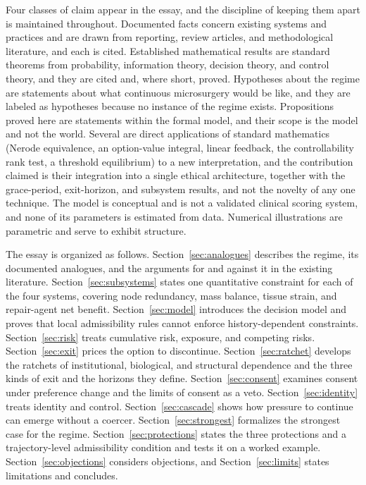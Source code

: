 \documentclass[11pt]{article}
\theoremstyle{plain}
\theoremstyle{definition}
\theoremstyle{remark}
\begin{document}
Four classes of claim appear in the essay, and the discipline of keeping them apart is maintained throughout. Documented facts concern existing systems and practices and are drawn from reporting, review articles, and methodological literature, and each is cited. Established mathematical results are standard theorems from probability, information theory, decision theory, and control theory, and they are cited and, where short, proved. Hypotheses about the regime are statements about what continuous microsurgery would be like, and they are labeled as hypotheses because no instance of the regime exists. Propositions proved here are statements within the formal model, and their scope is the model and not the world. Several are direct applications of standard mathematics (Nerode equivalence, an option-value integral, linear feedback, the controllability rank test, a threshold equilibrium) to a new interpretation, and the contribution claimed is their integration into a single ethical architecture, together with the grace-period, exit-horizon, and subsystem results, and not the novelty of any one technique. The model is conceptual and is not a validated clinical scoring system, and none of its parameters is estimated from data. Numerical illustrations are parametric and serve to exhibit structure.

The essay is organized as follows. Section~\ref{sec:analogues} describes the regime, its documented analogues, and the arguments for and against it in the existing literature. Section~\ref{sec:subsystems} states one quantitative constraint for each of the four systems, covering node redundancy, mass balance, tissue strain, and repair-agent net benefit. Section~\ref{sec:model} introduces the decision model and proves that local admissibility rules cannot enforce history-dependent constraints. Section~\ref{sec:risk} treats cumulative risk, exposure, and competing risks. Section~\ref{sec:exit} prices the option to discontinue. Section~\ref{sec:ratchet} develops the ratchets of institutional, biological, and structural dependence and the three kinds of exit and the horizons they define. Section~\ref{sec:consent} examines consent under preference change and the limits of consent as a veto. Section~\ref{sec:identity} treats identity and control. Section~\ref{sec:cascade} shows how pressure to continue can emerge without a coercer. Section~\ref{sec:strongest} formalizes the strongest case for the regime. Section~\ref{sec:protections} states the three protections and a trajectory-level admissibility condition and tests it on a worked example. Section~\ref{sec:objections} considers objections, and Section~\ref{sec:limits} states limitations and concludes.
\end{document}
